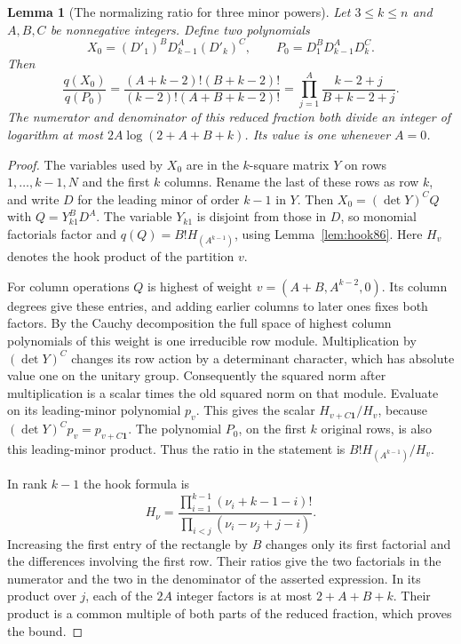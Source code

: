 \documentclass[a4paper,11pt]{article}
\newtheorem{lemma}[proposition]{Lemma}
\theoremstyle{definition}
\theoremstyle{remark}
\numberwithin{equation}{section}
\begin{document}
\begin{lemma}[The normalizing ratio for three minor powers]\leavevmode
\label{lem:threeminors349}
Let \(3\le k\le n\) and \(A,B,C\) be nonnegative integers.
Define two polynomials
\[
     X_0=(D'_1)^B D_{k-1}^A(D'_k)^C,\qquad
     P_0=D_1^B D_{k-1}^A D_k^C.
\]
Then
\[
 \frac{q(X_0)}{q(P_0)}
     =\frac{(A+k-2)!(B+k-2)!}{(k-2)!(A+B+k-2)!}
     =\prod_{j=1}^A \frac{k-2+j}{B+k-2+j}.
\]
The numerator and denominator of this reduced fraction both divide
an integer of logarithm at most \(2A\log(2+A+B+k)\). Its value
is one whenever \(A=0\).
\end{lemma}
\begin{proof}
The variables used by \(X_0\) are in the \(k\)-square matrix
\(Y\) on rows \(1,\ldots,k-1,N\) and the first \(k\) columns.
Rename the last of these rows as row \(k\), and write \(D\)
for the leading minor of order \(k-1\) in \(Y\).
Then \(X_0=(\det Y)^C Q\) with \(Q=Y_{k1}^B D^A\).
The variable \(Y_{k1}\) is disjoint from those in \(D\), so
monomial factorials factor and
\(q(Q)=B!H_{(A^{k-1})}\), using Lemma~\ref{lem:hook86}.
Here \(H_v\) denotes the hook product of the partition \(v\).

For column operations \(Q\) is highest of weight
\(v=(A+B,A^{k-2},0)\). Its column degrees give these entries,
and adding earlier columns to later ones fixes both factors.
By the Cauchy decomposition the full space of highest column
polynomials of this weight is one irreducible row module.
Multiplication by \((\det Y)^C\) changes its row action by
a determinant character, which has absolute value one on the
unitary group. Consequently the squared norm after multiplication
is a scalar times the old squared norm on that module.
Evaluate on its leading-minor polynomial \(p_v\). This gives
the scalar \(H_{v+C\mathbf1}/H_v\), because
\((\det Y)^Cp_v=p_{v+C\mathbf1}\). The polynomial \(P_0\),
on the first \(k\) original rows, is also this leading-minor
product. Thus the ratio in the statement is
\(B!H_{(A^{k-1})}/H_v\).

In rank \(k-1\) the hook formula is
\[
 H_\nu=\frac{\prod_{i=1}^{k-1}(\nu_i+k-1-i)!}
                   {\prod_{i<j}(\nu_i-\nu_j+j-i)} .
\]
Increasing the first entry of the rectangle by \(B\) changes
only its first factorial and the differences involving the first
row. Their ratios give the two factorials in the numerator and
the two in the denominator of the asserted expression. In its
product over \(j\), each of the \(2A\) integer factors is at
most \(2+A+B+k\). Their product is a common multiple of both
parts of the reduced fraction, which proves the bound.
\end{proof}
\end{document}
